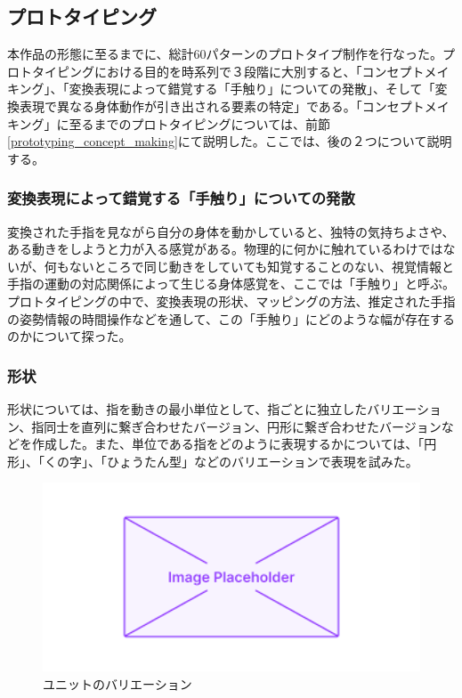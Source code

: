 \subsection{プロトタイピング}
本作品の形態に至るまでに、総計60パターンのプロトタイプ制作を行なった。プロトタイピングにおける目的を時系列で３段階に大別すると、「コンセプトメイキング」、「変換表現によって錯覚する「手触り」についての発散」、そして「変換表現で異なる身体動作が引き出される要素の特定」である。「コンセプトメイキング」に至るまでのプロトタイピングについては、前節\ref{prototyping_concept_making}にて説明した。ここでは、後の２つについて説明する。

\subsubsection{変換表現によって錯覚する「手触り」についての発散}
変換された手指を見ながら自分の身体を動かしていると、独特の気持ちよさや、ある動きをしようと力が入る感覚がある。物理的に何かに触れているわけではないが、何もないところで同じ動きをしていても知覚することのない、視覚情報と手指の運動の対応関係によって生じる身体感覚を、ここでは「手触り」と呼ぶ。
プロトタイピングの中で、変換表現の形状、マッピングの方法、推定された手指の姿勢情報の時間操作などを通して、この「手触り」にどのような幅が存在するのかについて探った。
\subsubsection*{形状}
形状については、指を動きの最小単位として、指ごとに独立したバリエーション、指同士を直列に繋ぎ合わせたバージョン、円形に繋ぎ合わせたバージョンなどを作成した。また、単位である指をどのように表現するかについては、「円形」、「くの字」、「ひょうたん型」などのバリエーションで表現を試みた。
\begin{figure}[H]
  \centering
  \includegraphics[width=15cm]{img/placeholder.png}
  \caption{ユニットのバリエーション}
  \label{fig:unit_valiation}
\end{figure}
